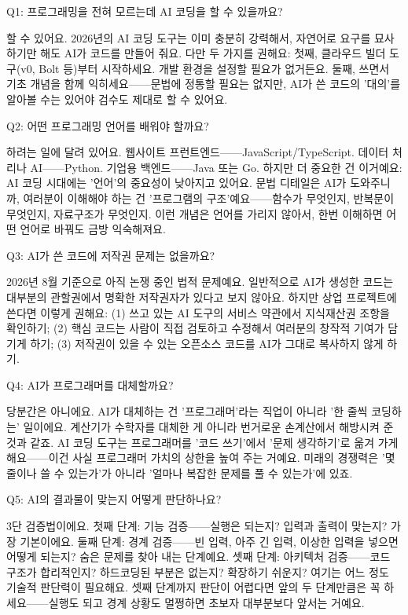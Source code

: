 
Q1: 프로그래밍을 전혀 모르는데 AI 코딩을 할 수 있을까요?

할 수 있어요. 2026년의 AI 코딩 도구는 이미 충분히 강력해서, 자연어로 요구를 묘사하기만 해도 AI가 코드를 만들어 줘요. 다만 두 가지를 권해요: 첫째, 클라우드 빌더 도구(v0, Bolt 등)부터 시작하세요. 개발 환경을 설정할 필요가 없거든요. 둘째, 쓰면서 기초 개념을 함께 익히세요——문법에 정통할 필요는 없지만, AI가 쓴 코드의 '대의'를 알아볼 수는 있어야 검수도 제대로 할 수 있어요.

Q2: 어떤 프로그래밍 언어를 배워야 할까요?

하려는 일에 달려 있어요. 웹사이트 프런트엔드——JavaScript/TypeScript. 데이터 처리나 AI——Python. 기업용 백엔드——Java 또는 Go. 하지만 더 중요한 건 이거예요: AI 코딩 시대에는 '언어'의 중요성이 낮아지고 있어요. 문법 디테일은 AI가 도와주니까, 여러분이 이해해야 하는 건 '프로그램의 구조'예요——함수가 무엇인지, 반복문이 무엇인지, 자료구조가 무엇인지. 이런 개념은 언어를 가리지 않아서, 한번 이해하면 어떤 언어로 바꿔도 금방 익숙해져요.

Q3: AI가 쓴 코드에 저작권 문제는 없을까요?

2026년 8월 기준으로 아직 논쟁 중인 법적 문제예요. 일반적으로 AI가 생성한 코드는 대부분의 관할권에서 명확한 저작권자가 있다고 보지 않아요. 하지만 상업 프로젝트에 쓴다면 이렇게 권해요: (1) 쓰고 있는 AI 도구의 서비스 약관에서 지식재산권 조항을 확인하기; (2) 핵심 코드는 사람이 직접 검토하고 수정해서 여러분의 창작적 기여가 담기게 하기; (3) 저작권이 있을 수 있는 오픈소스 코드를 AI가 그대로 복사하지 않게 하기.

Q4: AI가 프로그래머를 대체할까요?

당분간은 아니에요. AI가 대체하는 건 '프로그래머'라는 직업이 아니라 '한 줄씩 코딩하는' 일이에요. 계산기가 수학자를 대체한 게 아니라 번거로운 손계산에서 해방시켜 준 것과 같죠. AI 코딩 도구는 프로그래머를 '코드 쓰기'에서 '문제 생각하기'로 옮겨 가게 해요——이건 사실 프로그래머 가치의 상한을 높여 주는 거예요. 미래의 경쟁력은 '몇 줄이나 쓸 수 있는가'가 아니라 '얼마나 복잡한 문제를 풀 수 있는가'에 있죠.

Q5: AI의 결과물이 맞는지 어떻게 판단하나요?

3단 검증법이에요. 첫째 단계: 기능 검증——실행은 되는지? 입력과 출력이 맞는지? 가장 기본이에요. 둘째 단계: 경계 검증——빈 입력, 아주 긴 입력, 이상한 입력을 넣으면 어떻게 되는지? 숨은 문제를 찾아 내는 단계예요. 셋째 단계: 아키텍처 검증——코드 구조가 합리적인지? 하드코딩된 부분은 없는지? 확장하기 쉬운지? 여기는 어느 정도 기술적 판단력이 필요해요. 셋째 단계까지 판단이 어렵다면 앞의 두 단계만큼은 꼭 하세요——실행도 되고 경계 상황도 멀쩡하면 초보자 대부분보다 앞서는 거예요.


